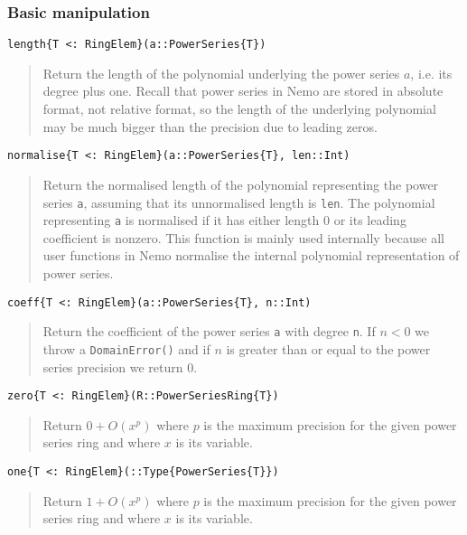 \documentclass[a4paper,10pt]{article}
\newcommand{\code}{\lstinline}
\newcommand{\desc}[1]{\vspace{-3mm}\begin{quote}#1\end{quote}}
\begin{document}
\subsubsection{Basic manipulation}

\begin{lstlisting}
length{T <: RingElem}(a::PowerSeries{T})
\end{lstlisting}

\desc{Return the length of the polynomial underlying the power series $a$, i.e.
its degree plus one. Recall that power series in Nemo are stored in absolute
format, not relative format, so the length of the underlying polynomial may be
much bigger than the precision due to leading zeros.}

\begin{lstlisting}
normalise{T <: RingElem}(a::PowerSeries{T}, len::Int)
\end{lstlisting}

\desc{Return the normalised length of the polynomial representing the power
series \code{a}, assuming that its unnormalised length is \code{len}. The
polynomial representing \code{a} is normalised if it has either length $0$
or its leading coefficient is nonzero. This function is mainly used internally
because all user functions in Nemo normalise the internal polynomial
representation of power series.}

\begin{lstlisting}
coeff{T <: RingElem}(a::PowerSeries{T}, n::Int)
\end{lstlisting}

\desc{Return the coefficient of the power series \code{a} with degree 
\code{n}. If $n < 0$ we throw a \code{DomainError()} and if $n$ is greater
than or equal to the power series precision we return $0$.}

\begin{lstlisting}
zero{T <: RingElem}(R::PowerSeriesRing{T})
\end{lstlisting}

\desc{Return $0 + O(x^p)$ where $p$ is the maximum precision for the
given power series ring and where $x$ is its variable.}

\begin{lstlisting}
one{T <: RingElem}(::Type{PowerSeries{T}})
\end{lstlisting}

\desc{Return $1 + O(x^p)$ where $p$ is the maximum precision for the
given power series ring and where $x$ is its variable.}
\end{document}

